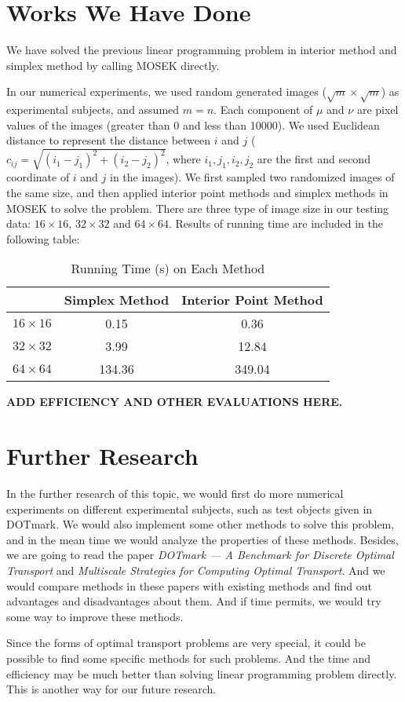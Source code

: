 \documentclass[english]{PKUPaper}
\begin{document}
\section{Works We Have Done}
\par We have solved the previous linear programming problem in interior method and simplex method by calling MOSEK directly. 
\par In our numerical experiments, we used random generated images ($\sqrt{m}\times\sqrt{m}$) as experimental subjects, and assumed $m=n$. Each component of $\mu$ and $\nu$ are pixel values of the images (greater than 0 and less than 10000). We used Euclidean distance to represent the distance between $i$ and $j$ ($c_{ij}=\sqrt{(i_1-j_1)^2+(i_2-j_2)^2}$, where $i_1, j_1, i_2, j_2$ are the first and second coordinate of $i$ and $j$ in the images). We first sampled two randomized images of the same size, and then applied interior point methods and simplex methods in MOSEK to solve the problem. There are three type of  image size in our testing data: $16\times 16$, $32\times 32$ and $64\times 64$. Results of running time are included in the following table:
\begin{table}[h]
\caption{Running Time (s) on Each Method}
\centering
\begin{tabular}{c|cc}
	\hline
	& Simplex Method & Interior Point Method\\
	\hline
	$16\times 16$ & 0.15 & 0.36\\
	\hline
	$32\times 32$ & 3.99 & 12.84 \\
	\hline
	$64\times 64$ & 134.36 & 349.04 \\
	\hline
\end{tabular}
\end{table}

\textbf{ADD EFFICIENCY AND OTHER EVALUATIONS HERE.}

\section{Further Research}
\par In the further research of this topic, we would first do more numerical experiments on different experimental subjects, such as test objects given in DOTmark. We would also implement some other methods  to solve this problem, and in the mean time we would analyze the properties of these methods. Besides, we are going to read the paper \emph{DOTmark — A Benchmark for Discrete Optimal Transport} and \emph{Multiscale Strategies for Computing Optimal Transport}. And we would compare methods in these papers with existing methods and find out advantages and disadvantages about them. And if time permits, we would try some way to improve these methods.
\par Since the forms of optimal transport problems are very special, it could be possible to find some specific methods for such problems. And the time and efficiency may be much better than solving linear programming problem directly. This is another way for our future research.
\end{document}
